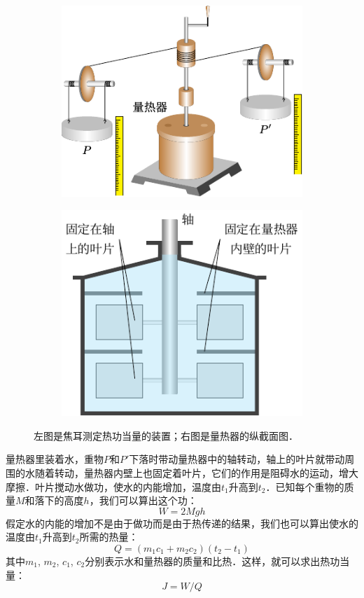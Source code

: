 \begin{figure}[htbp]
    \centering
    \begin{subfigure}{0.4\linewidth}
        \centering
        \includegraphics{fig/B/2-2a.pdf}
        \caption{}\label{fig_B_2-2a}
    \end{subfigure}
    \hfill
    \begin{subfigure}{0.4\linewidth}
        \centering
        \includegraphics{fig/B/2-2b.pdf}
        \caption{}\label{fig_B_2-2b}
    \end{subfigure}
    \caption{左图是焦耳测定热功当量的装置；右图是量热器的纵截面图．}\label{fig_B_2-2}
\end{figure}


量热器里装着水，重物$P$和$P'$下落时带动量热器中的轴转动，轴上的叶片就带动周围的水随着转动，量热器内壁上也固定着叶片，它们的作用是阻碍水的运动，增大摩擦．叶片搅动水做功，使水的内能增加，温度由$t_1$升高到$t_2$．已知每个重物的质量$M$和落下的高度$h$，我们可以算出这个功：
$$W=2Mgh $$
假定水的内能的增加不是由于做功而是由于热传递的结果，我们也可以算出使水的温度由$t_1$升高到$t_2$所需的热量：
\[Q=(m_1c_1+m_2c_2)(t_2-t_1)\]
其中$m_1$, $m_2$, $c_1$, $c_2$分别表示水和量热器的质量和比热．这样，就可以求出热功当量：
\[J=W/Q\]

